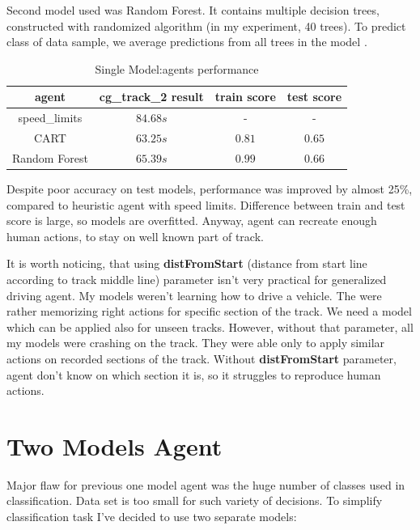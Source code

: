 \documentclass[declaration,shortabstract,english,inz]{iithesis}
\begin{document}
Second model used was Random Forest.
It contains multiple decision trees, constructed with randomized algorithm (in my experiment, 40 trees).
To predict class of data sample, we average predictions from all trees in the model \cite{Introduction_ML}.


\begin{table}[h]
    \centering
    \begin{tabular}{ |c|c|c|c|}
          \hline
          agent & cg\_track\_2 result & train score & test score \\
          \hline
          speed\_limits & $84.68s$ & - & -\\
          \hline
          CART &  $63.25s$ & $0.81$ & $0.65$\\
          \hline
          Random Forest & $65.39s$ & $0.99$ & $0.66$ \\
          \hline
          
        \end{tabular}
        \caption{Single Model:agents performance}
        \label{tab:single_clp_tree}

\end{table}


Despite poor accuracy on test models, performance was improved by almost 25\%, compared to heuristic agent with speed limits.
Difference between train and test score is large, so models are overfitted.
Anyway, agent can recreate enough human actions, to stay on well known part of track.


It is worth noticing, that using \textbf{distFromStart} (distance from start line according to track middle line) parameter isn't very practical for generalized driving agent.
My models weren't learning how to drive a vehicle.
The were rather memorizing right actions for specific section of the track.
We need a model which can be applied also for unseen tracks.
However, without that parameter, all my models were crashing on the track.
They were able only to apply similar actions on recorded sections of the track. Without \textbf{distFromStart} parameter, agent don't know on which section it is, so it struggles to reproduce human actions.

\section{Two Models Agent}

Major flaw for previous one model agent was the huge number of classes used in classification.
Data set is too small for such variety of decisions.
To simplify classification task I've decided to use two separate models: 
\end{document}
